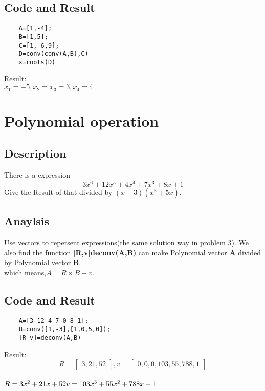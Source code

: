 \documentclass[UTF8,a4paper]{article}
\begin{document}
\subsection{Code and Result}
\begin{lstlisting}
    A=[1,-4];
    B=[1,5];
    C=[1,-6,9];
    D=conv(conv(A,B),C)
    x=roots(D)
\end{lstlisting}
Result:\\
$x_1=-5,x_2=x_3=3,x_4=4$
\section{Polynomial operation}
\subsection{Description}
There is a expression
$$
3x^6+12x^5+4x^4+7x^3+8x+1
$$
Give the Result of that divided by $(x-3)(x^3+5x)$.
\subsection{Anaylsis}
Use vectors to repersent expressions(the same solution way in problem 3).
We also find the function \textbf{[R,v]deconv(A,B)} can make Polynomial vector \textbf{A} divided by Polynomial vector \textbf{B}.\\
which means,$A=R\times B+v$.
\subsection{Code and Result}
\begin{lstlisting}
    A=[3 12 4 7 0 8 1];
    B=conv([1,-3],[1,0,5,0]);
    [R v]=deconv(A,B)    
\end{lstlisting}
Result:\\
\[R=\begin{bmatrix}
    3,21,52  
\end{bmatrix} 
,v=\begin{bmatrix}
    0,0,0,103,55,788,1  
\end{bmatrix} 
\]\\
$R=3x^2+21x+52\\
v=103x^3+55x^2+788x+1$
\end{document}

